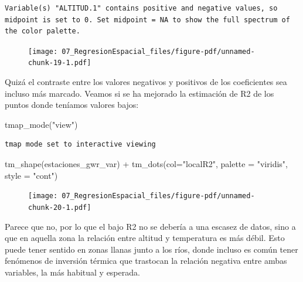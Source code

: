 \documentclass[
  letterpaper,
  DIV=11,
  numbers=noendperiod]{scrreprt}
\newenvironment{Shaded}{\begin{snugshade}}{\end{snugshade}}
\newcommand{\AttributeTok}[1]{\textcolor[rgb]{0.40,0.45,0.13}{#1}}
\newcommand{\FunctionTok}[1]{\textcolor[rgb]{0.28,0.35,0.67}{#1}}
\newcommand{\NormalTok}[1]{\textcolor[rgb]{0.00,0.23,0.31}{#1}}
\newcommand{\SpecialCharTok}[1]{\textcolor[rgb]{0.37,0.37,0.37}{#1}}
\newcommand{\StringTok}[1]{\textcolor[rgb]{0.13,0.47,0.30}{#1}}
\begin{document}
\begin{verbatim}
Variable(s) "ALTITUD.1" contains positive and negative values, so midpoint is set to 0. Set midpoint = NA to show the full spectrum of the color palette.
\end{verbatim}

\begin{figure}[H]

{\centering \texttt{[image: 07\_RegresionEspacial\_files/figure-pdf/unnamed-chunk-19-1.pdf]}

}

\end{figure}

Quizá el contraste entre los valores negativos y positivos de los
coeficientes sea incluso más marcado. Veamos si se ha mejorado la
estimación de R2 de los puntos donde teníamos valores bajos:

\begin{Shaded}
\begin{Highlighting}[]
\FunctionTok{tmap\_mode}\NormalTok{(}\StringTok{"view"}\NormalTok{)}
\end{Highlighting}
\end{Shaded}

\begin{verbatim}
tmap mode set to interactive viewing
\end{verbatim}

\begin{Shaded}
\begin{Highlighting}[]
\FunctionTok{tm\_shape}\NormalTok{(estaciones\_gwr\_var) }\SpecialCharTok{+}
    \FunctionTok{tm\_dots}\NormalTok{(}\AttributeTok{col=}\StringTok{"localR2"}\NormalTok{, }\AttributeTok{palette =} \StringTok{"viridis"}\NormalTok{, }\AttributeTok{style =} \StringTok{"cont"}\NormalTok{)}
\end{Highlighting}
\end{Shaded}

\begin{figure}[H]

{\centering \texttt{[image: 07\_RegresionEspacial\_files/figure-pdf/unnamed-chunk-20-1.pdf]}

}

\end{figure}

Parece que no, por lo que el bajo R2 no se debería a una escasez de
datos, sino a que en aquella zona la relación entre altitud y
temperatura es más débil. Esto puede tener sentido en zonas llanas junto
a los ríos, donde incluso es común tener fenómenos de inversión térmica
que trastocan la relación negativa entre ambas variables, la más
habitual y esperada.
\end{document}
